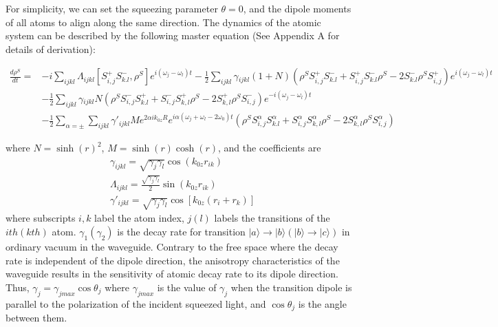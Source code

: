 \documentclass[aps,showpacs,twocolumn,twoside,groupedaddress]{revtex4}
\begin{document}
For simplicity, we can set the squeezing parameter $\theta=0$, and the dipole moments of all atoms to align along the same direction. The dynamics of the atomic system can be described by the following master equation (See Appendix A for details of derivation):
\begin{widetext}
\begin{equation}
\label{eq1}
\begin{split}
\frac{d\rho^{S}}{dt}=&-i\underset{ijkl}{\sum}\Lambda_{ijkl}[S_{i,j}^{+}S_{k.l}^{-},\rho^{S}]e^{i(\omega_{j}-\omega_{l})t}-\frac{1}{2}\underset{ijkl}{\sum}\gamma{}_{ijkl}(1+N)(\rho^{S}S_{i,j}^{+}S_{k.l}^{-}+S_{i,j}^{+}S_{k.l}^{-}\rho^{S}-2S_{k.l}^{-}\rho^{S}S_{i,j}^{+})e^{i(\omega_{j}-\omega_{l})t}\\
&-\frac{1}{2}\underset{ijkl}{\sum}\gamma{}_{ijkl}N(\rho^{S}S_{i,j}^{-}S_{k.l}^{+}+S_{i,j}^{-}S_{k,l}^{+}\rho^{S}-2S_{k,l}^{+}\rho^{S}S_{i,j}^{-})e^{-i(\omega_{j}-\omega_{l})t}\\
&-\frac{1}{2}\sum_{\alpha=\pm}\underset{ijkl}{\sum}\gamma'_{ijkl}Me^{2\alpha ik_{0z}R}e^{i\alpha(\omega_{j}+\omega_{l}-2\omega_{0})t}(\rho^{S}S_{i,j}^{\alpha}S_{k.l}^{\alpha}+S_{i,j}^{\alpha}S_{k,l}^{\alpha}\rho^{S}-2S_{k,l}^{\alpha}\rho^{S}S_{i,j}^{\alpha})
\end{split}
\end{equation}
\end{widetext}
where $N=\sinh(r)^2$, $M=\sinh(r)\cosh(r)$, and the coefficients are
\begin{equation}
\label{eq2}
\begin{split}
& \gamma_{ijkl}=\sqrt{\gamma_{j}\gamma_{l}}\cos(k_{0z}r_{ik}) \\
& \Lambda_{ijkl}=\frac{\sqrt{\gamma_{j}\gamma_{l}}}{2}\sin(k_{0z}r_{ik})\\
& \gamma'_{ijkl}=\sqrt{\gamma_{j}\gamma_{l}}\cos[k_{0z}(r_{i}+r_{k})]
\end{split}
\end{equation}
where subscripts $i,k$ label the atom index, $j(l)$ labels the transitions of the $ith (kth)$ atom. $\gamma_{1}(\gamma_{2})$ is the decay rate for transition $|a\rangle\rightarrow|b\rangle(|b\rangle\rightarrow|c\rangle)$ in ordinary vacuum in the waveguide. Contrary to the free space where the decay rate is independent of the dipole direction, the anisotropy characteristics of the waveguide results in the sensitivity of atomic decay rate to its dipole direction. Thus, $\gamma_j=\gamma_{jmax}\cos\theta_j$ where $\gamma_{jmax}$ is the value of $\gamma_{j}$ when the transition dipole is parallel to the polarization of the incident squeezed light, and $\cos\theta_j$ is the angle between them.
\end{document}
